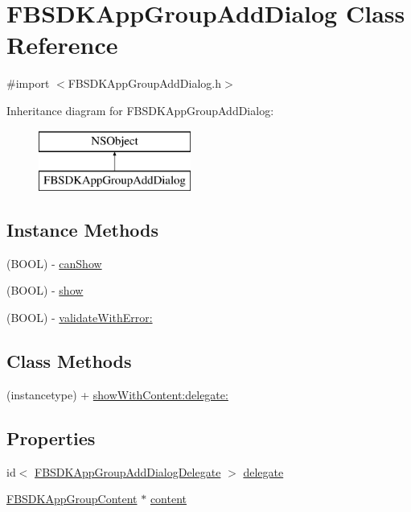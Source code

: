 \hypertarget{interface_f_b_s_d_k_app_group_add_dialog}{}\section{F\+B\+S\+D\+K\+App\+Group\+Add\+Dialog Class Reference}
\label{interface_f_b_s_d_k_app_group_add_dialog}


{\ttfamily \#import $<$F\+B\+S\+D\+K\+App\+Group\+Add\+Dialog.\+h$>$}

Inheritance diagram for F\+B\+S\+D\+K\+App\+Group\+Add\+Dialog\+:\begin{figure}[H]
\begin{center}
\leavevmode
\includegraphics[height=2.000000cm]{interface_f_b_s_d_k_app_group_add_dialog}
\end{center}
\end{figure}
\subsection*{Instance Methods}
\begin{DoxyCompactItemize}
\item 
(B\+O\+O\+L) -\/ \hyperlink{interface_f_b_s_d_k_app_group_add_dialog_a845f3b19aec34ac420fac564ec70e6dc}{can\+Show}
\item 
(B\+O\+O\+L) -\/ \hyperlink{interface_f_b_s_d_k_app_group_add_dialog_a0c274c0f03da8de5955022653fe8b42c}{show}
\item 
(B\+O\+O\+L) -\/ \hyperlink{interface_f_b_s_d_k_app_group_add_dialog_a2e868eff528a05e5d4a39bb36d058534}{validate\+With\+Error\+:}
\end{DoxyCompactItemize}
\subsection*{Class Methods}
\begin{DoxyCompactItemize}
\item 
(instancetype) + \hyperlink{interface_f_b_s_d_k_app_group_add_dialog_a832b5f995d7f3d59df7eb225c4e8e898}{show\+With\+Content\+:delegate\+:}
\end{DoxyCompactItemize}
\subsection*{Properties}
\begin{DoxyCompactItemize}
\item 
id$<$ \hyperlink{protocol_f_b_s_d_k_app_group_add_dialog_delegate-p}{F\+B\+S\+D\+K\+App\+Group\+Add\+Dialog\+Delegate} $>$ \hyperlink{interface_f_b_s_d_k_app_group_add_dialog_a0a92aa54b858fdf0f62b6d98bc09ab80}{delegate}
\item 
\hyperlink{interface_f_b_s_d_k_app_group_content}{F\+B\+S\+D\+K\+App\+Group\+Content} $\ast$ \hyperlink{interface_f_b_s_d_k_app_group_add_dialog_a2a7109b4320ff393d28fff95e6bff301}{content}
\end{DoxyCompactItemize}


